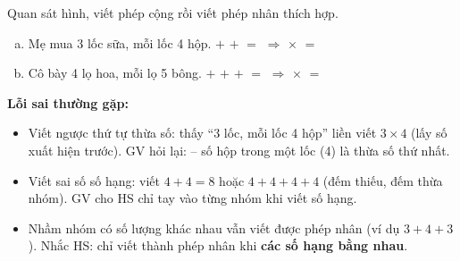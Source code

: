 \documentclass[../main.tex]{subfiles}
\begin{document}
\begin{bt}
Quan sát hình, viết phép cộng rồi viết phép nhân thích hợp.
\begin{enumerate}[a)]
    \item Mẹ mua 3 lốc sữa, mỗi lốc 4 hộp.
    \TTcham[1.5cm] $+$ \TTcham[1.5cm] $+$ \TTcham[1.5cm] $=$ \TTcham[1.5cm] $\Rightarrow$ \TTcham[1.5cm] $\times$ \TTcham[1.5cm] $=$ \TTcham[1.5cm]\par
    \item Cô bày 4 lọ hoa, mỗi lọ 5 bông.
    \TTcham[1.5cm] $+$ \TTcham[1.5cm] $+$ \TTcham[1.5cm] $+$ \TTcham[1.5cm] $=$ \TTcham[1.5cm] $\Rightarrow$ \TTcham[1.5cm] $\times$ \TTcham[1.5cm] $=$ \TTcham[1.5cm]\par
\end{enumerate}
\end{bt}
\begin{luuy}
    \textbf{Lỗi sai thường gặp:}
    \begin{itemize}
        \item Viết ngược thứ tự thừa số: thấy “3 lốc, mỗi lốc 4 hộp” liền viết $3 \times 4$ (lấy số xuất hiện trước). GV hỏi lại:  -- số hộp trong một lốc (4) là thừa số thứ nhất.
        \item Viết sai số số hạng: viết $4 + 4 = 8$ hoặc $4 + 4 + 4 + 4$ (đếm thiếu, đếm thừa nhóm). GV cho HS chỉ tay vào từng nhóm khi viết số hạng.
        \item Nhầm nhóm có số lượng khác nhau vẫn viết được phép nhân (ví dụ $3 + 4 + 3$). Nhắc HS: chỉ viết thành phép nhân khi \textbf{các số hạng bằng nhau}.
    \end{itemize}
\end{luuy}
\newpage
\end{document}
